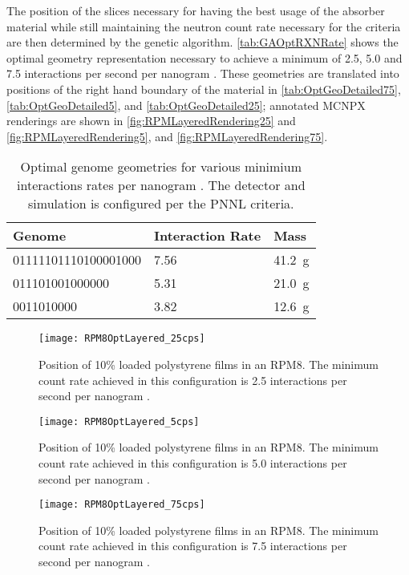 The position of the slices necessary for having the best usage of the absorber material while still maintaining the neutron count rate necessary for the criteria are then determined by the genetic algorithm.
\autoref{tab:GAOptRXNRate} shows the optimal geometry representation necessary to achieve a minimum of 2.5, 5.0 and 7.5 interactions per second per nanogram .
These geometries are translated into positions of the right hand boundary of the material in \autoref{tab:OptGeoDetailed75},\autoref{tab:OptGeoDetailed5}, and \autoref{tab:OptGeoDetailed25}; annotated MCNPX renderings are shown in \autoref{fig:RPMLayeredRendering25} and \autoref{fig:RPMLayeredRendering5}, and \autoref{fig:RPMLayeredRendering75}.
\begin{table}
	\caption[Optimal geometry for various interaction rates]{Optimal genome geometries for various minimium interactions rates per nanogram . The detector and simulation is configured per the PNNL criteria.}
	\label{tab:GAOptRXNRate}
	\begin{tabular}{m{7cm} m{5cm} m{2cm} }
	\toprule
	Genome & Interaction Rate & Mass \iso[6]{Li} \\
	\midrule
	01111101110100001000 & 7.56 & \SI{41.2}{\gram} \\
	011101001000000 & 5.31 & \SI{21.0}{\gram} \\
		0011010000 & 3.82 & \SI{12.6}{\gram} \\
	\bottomrule
	\end{tabular}
\end{table}


\begin{figure}
  \centering
  \texttt{[image: RPM8OptLayered\_25cps]}
  \caption[Position of Films in Optimized Layered RPM8 (2.5 interactions per nanogram Cf-252)]{Position of 10\%  loaded polystyrene films in  an RPM8. The minimum count rate achieved in this configuration is 2.5 interactions per second per nanogram .}
  \label{fig:RPMLayeredRendering25}
\end{figure}
\begin{figure}
  \centering
  \texttt{[image: RPM8OptLayered\_5cps]}
  \caption[Position of Films in Optimized Layered RPM8 (5.0 interactions per nanogram Cf-252)]{Position of 10\%  loaded polystyrene films in  an RPM8. The minimum count rate achieved in this configuration is 5.0 interactions per second per nanogram .}
  \label{fig:RPMLayeredRendering5}
\end{figure}
\begin{figure}
  \centering
  \texttt{[image: RPM8OptLayered\_75cps]}
  \caption[Position of Films in Optimized Layered RPM8 (7.5 interactions per nanogram Cf-252)]{Position of 10\%  loaded polystyrene films in  an RPM8. The minimum count rate achieved in this configuration is 7.5 interactions per second per nanogram .}
  \label{fig:RPMLayeredRendering75}
\end{figure}


